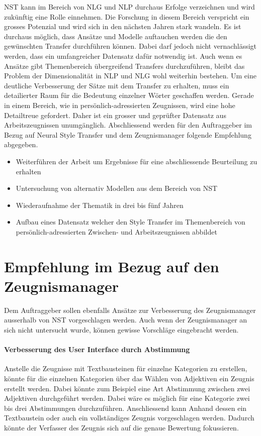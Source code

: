 \gls{NST} kann im Bereich von \gls{NLG} und \gls{NLP} durchaus Erfolge verzeichnen und wird zukünftig eine Rolle
einnehmen. Die Forschung in diesem Bereich verspricht ein grosses Potenzial und wird sich in den nächsten Jahren stark
wandeln. Es ist durchaus möglich, dass Ansätze und Modelle auftauchen werden die den gewünschten Transfer durchführen
können. Dabei darf jedoch nicht vernachlässigt werden, dass ein umfangreicher Datensatz dafür notwendig ist. Auch wenn
es Ansätze gibt Themenbereich übergreifend Transfers durchzuführen, bleibt das Problem der Dimensionalität in \gls{NLP}
und \gls{NLG} wohl weiterhin bestehen. Um eine deutliche Verbesserung der Sätze mit dem Transfer zu erhalten, muss ein
detailierter Raum für die Bedeutung einzelner Wörter geschaffen werden. Gerade in einem Bereich, wie in
persönlich-adressierten Zeugnissen, wird eine hohe Detailtreue gefordert. Daher ist ein grosser und geprüfter Datensatz
aus Arbeitszeugnissen unumgänglich.
\newline
\newline
Abschliessend werden für den Auftraggeber im Bezug auf Neural Style Transfer und dem Zeugnismanager folgende Empfehlung
abgegeben.

\begin{itemize}
    \setlength\itemsep{0em}
  \item Weiterführen der Arbeit um Ergebnisse für eine abschliessende Beurteilung zu erhalten
  \item Untersuchung von alternativ Modellen aus dem Bereich von \gls{NST}
  \item Wiederaufnahme der Thematik in drei bis fünf Jahren
  \item Aufbau eines Datensatz welcher den Style Transfer im Themenbereich von persönlich-adressierten Zwischen- und
  Arbeitszeugnissen abbildet
\end{itemize}

\section{Empfehlung im Bezug auf den Zeugnismanager}
\label{sec:empfehlung_zeugnismanager}

Dem Auftraggeber sollen ebenfalls Ansätze zur Verbesserung des Zeugnismanager ausserhalb von \gls{NST} vorgeschlagen
werden. Auch wenn der Zeugnismanager an sich nicht untersucht wurde, können gewisse Vorschläge eingebracht werden.

\paragraph{Verbesserung des User Interface durch Abstimmung} Anstelle die Zeugnisse mit Textbausteinen für einzelne
Kategorien zu erstellen, könnte für die einzelnen Kategorien über das Wählen von Adjektiven ein Zeugnis erstellt werden.
Dabei könnte zum Beispiel eine Art Abstimmung zwischen zwei Adjektiven durchgeführt werden. Dabei wäre es möglich für
eine Kategorie zwei bis drei Abstimmungen durchzuführen. Anschliessend kann Anhand dessen ein Textbaustein oder auch ein
vollständiges Zeugnis vorgeschlagen werden. Dadurch könnte der Verfasser des Zeugnis sich auf die genaue Bewertung
fokussieren.

